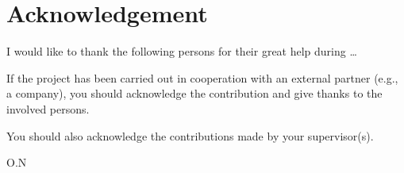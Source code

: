 \newpage
{}
\section*{Acknowledgement}
\label{sec:acknowledgement}
\begin{info}
	I would like to thank the following persons for their great help during \ldots

	If the project has been carried out in cooperation with an external partner (e.g., a company), you should acknowledge the contribution and give thanks to the involved persons.

	You should also acknowledge the contributions made by your supervisor(s). 
\end{info}



\vspace*{3cm}
\begin{flushright}
	O.N\\[1pc]
\end{flushright}

